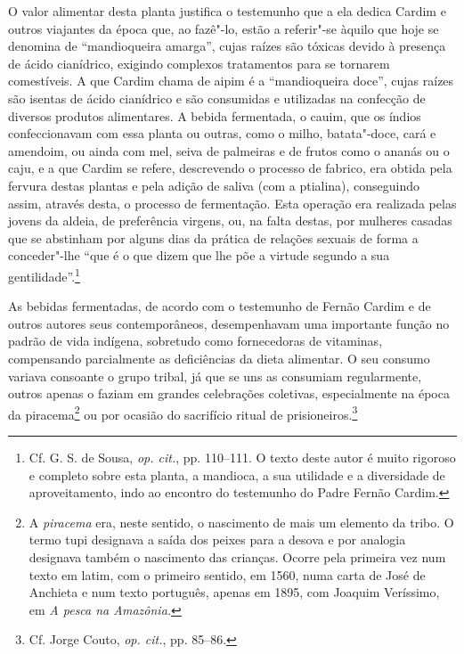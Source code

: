  O valor alimentar desta planta justifica o testemunho que a
ela dedica Cardim e outros viajantes da época que, ao fazê"-lo, estão a
referir"-se àquilo que hoje se denomina de ``mandioqueira amarga'', cujas
raízes são tóxicas devido à presença de ácido cianídrico, exigindo
complexos tratamentos para se tornarem comestíveis. A que Cardim chama
de aipim é a ``mandioqueira doce'', cujas raízes são isentas de
ácido cianídrico e são consumidas e utilizadas na confecção de diversos
produtos alimentares. A bebida fermentada, o cauim, que os
índios confeccionavam com essa planta ou outras, como o milho,
batata"-doce, cará e amendoim, ou ainda com mel, seiva de palmeiras e
de frutos como o ananás ou o caju, e a que Cardim se refere,
descrevendo o processo de fabrico, era obtida pela fervura destas
plantas e pela adição de saliva (com a ptialina), conseguindo
assim, através desta, o processo de fermentação. Esta operação era
realizada pelas jovens da aldeia, de preferência virgens, ou, na falta
destas, por mulheres casadas que se abstinham por alguns dias da
prática de relações sexuais de forma a conceder"-lhe ``que
é o que dizem que lhe põe a virtude segundo a sua 
gentilidade''.\footnote{ Cf. G. S. de Sousa, \textit{op. cit.}, pp. 110--111. O
texto deste autor é muito rigoroso e completo sobre esta planta, a
mandioca, a sua utilidade e a diversidade de aproveitamento,
indo ao encontro do testemunho do Padre Fernão Cardim.} 

 As bebidas fermentadas, de acordo com o testemunho de Fernão
Cardim e de outros autores seus contemporâneos, desempenhavam uma
importante função no padrão de vida indígena, sobretudo como
fornecedoras de vitaminas, compensando parcialmente as deficiências da
dieta alimentar. O seu consumo variava consoante o grupo tribal, já que
se uns as consumiam regularmente, outros apenas o faziam em grandes
celebrações coletivas, especialmente na época da piracema\footnote{ A \textit{piracema} 
era, neste sentido, o nascimento de mais um
elemento da tribo. O termo tupi designava a saída dos peixes para a
desova e por analogia designava também o nascimento das crianças.
Ocorre pela primeira vez num texto em latim, com o primeiro sentido, em
1560, numa carta de José de Anchieta e num texto português,
apenas em 1895, com Joaquim Veríssimo, em \textit{A pesca na
Amazônia.}} ou por ocasião do sacrifício ritual de 
prisioneiros.\footnote{ Cf. Jorge Couto, \textit{op. cit.}, pp. 85--86.}

